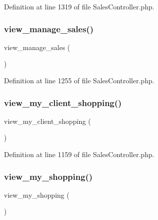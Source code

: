 Definition at line 1319 of file Sales\+Controller.\+php.

\mbox{\label{class_responsive_1_1_http_1_1_controllers_1_1_sales_controller_a369ca7780b30f19528a574b0bae35c72}} 
\subsubsection{\texorpdfstring{view\_manage\_sales()}{view\_manage\_sales()}}
{\footnotesize\ttfamily view\+\_\+manage\+\_\+sales (\begin{DoxyParamCaption}{ }\end{DoxyParamCaption})}



Definition at line 1255 of file Sales\+Controller.\+php.

\mbox{\label{class_responsive_1_1_http_1_1_controllers_1_1_sales_controller_a4b756bcdd0c878126d2aaf1c7c4c7c46}} 
\subsubsection{\texorpdfstring{view\_my\_client\_shopping()}{view\_my\_client\_shopping()}}
{\footnotesize\ttfamily view\+\_\+my\+\_\+client\+\_\+shopping (\begin{DoxyParamCaption}{ }\end{DoxyParamCaption})}



Definition at line 1159 of file Sales\+Controller.\+php.

\mbox{\label{class_responsive_1_1_http_1_1_controllers_1_1_sales_controller_af9d02e3dd4c9de85335b63e07e271fc7}} 
\subsubsection{\texorpdfstring{view\_my\_shopping()}{view\_my\_shopping()}}
{\footnotesize\ttfamily view\+\_\+my\+\_\+shopping (\begin{DoxyParamCaption}{ }\end{DoxyParamCaption})}



